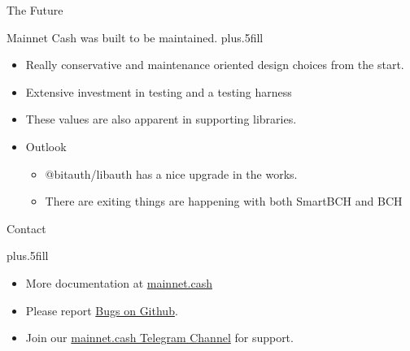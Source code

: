 \documentclass{beamer}
\begin{document}
\begin{frame}{The Future}

Mainnet Cash was built to be maintained.
\vskip0pt plus.5fill

\begin{itemize}
\item
    Really conservative and maintenance oriented design choices from the start.
\item
    Extensive investment in testing and a testing harness
\item
    These values are also apparent in supporting libraries.
\end{itemize}


\begin{itemize}
\item
    Outlook
    \begin{itemize}
    \item
    \alert{@bitauth/libauth} has a nice upgrade in the works.
    \item
    There are exiting things are happening with both SmartBCH and BCH
    \end{itemize}
\end{itemize}
\end{frame}

\begin{frame}{Contact}

    
    \vskip0pt plus.5fill
    
    \begin{itemize}

       \item More documentation at \href{https://mainnet.cash/tutorial/smartbch.html}{mainnet.cash}
       \item Please report \href{https://github.com/mainnet-cash/mainnet-js/issues}{Bugs on Github}.
       \item Join our \href{https://t.me/mainnetcash}{ mainnet.cash Telegram Channel} for support.
    \end{itemize}

\end{frame}
\end{document}
